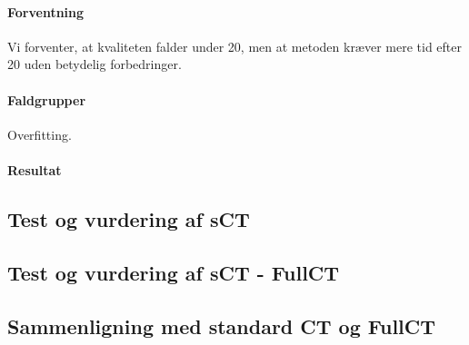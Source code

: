\paragraph{Forventning}
Vi forventer, at kvaliteten falder under 20, men at metoden kræver mere tid
efter 20 uden betydelig forbedringer.

\paragraph{Faldgrupper}
Overfitting. 

\paragraph{Resultat}



\subsection{Test og vurdering af sCT}


\subsection{Test og vurdering af sCT - FullCT}


\subsection{Sammenligning med standard CT og FullCT}

